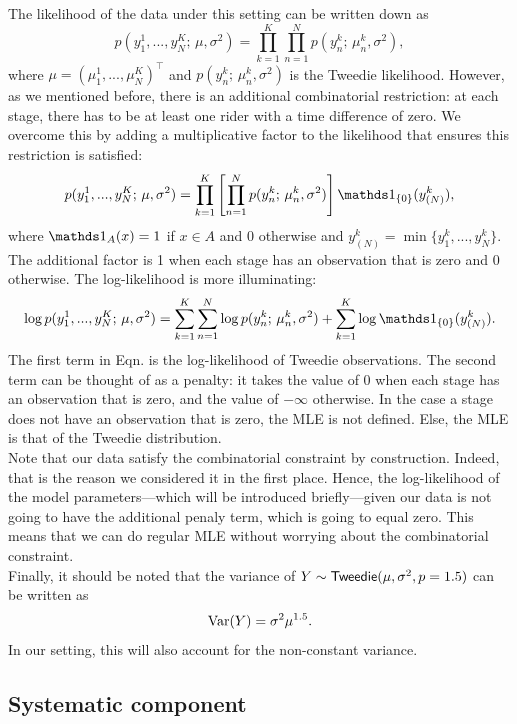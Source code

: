 \documentclass[aos,preprint]{imsart}
\begin{document}
The likelihood of the data under this setting can be written down as
\[
  p(y_1^1, ..., y_N^K; \, \mu, \sigma^2) = \prod_{k=1}^K \prod_{n=1}^N p(y_n^k; \, \mu_n^k, \sigma^2),
\]
where $\mu = (\mu_1^1, ..., \mu_N^K)^\top$ and $p(y_n^k; \, \mu_n^k, \sigma^2)$ is the Tweedie likelihood. However, as we mentioned before, there is an additional combinatorial restriction: at each stage, there has to be at least one rider with a time difference of zero. We overcome this by adding a multiplicative factor to the likelihood that ensures this restriction is satisfied:
\[
  p(y_1^1, ..., y_N^K; \, \mu, \sigma^2) = \prod_{k=1}^K \left[ \prod_{n=1}^N p(y_n^k; \, \mu_n^k, \sigma^2) \right] \ind_{\{ 0\}} (y_{(N)}^k),
\]
where $\ind_A(x) = 1$ if $x \in A$ and 0 otherwise and $y_{(N)}^k = \min \{y_1^k, ..., y_N^k \}$. The additional factor is 1 when each stage has an observation that is zero and 0 otherwise. The log-likelihood is more illuminating:
\[
  \log p(y_1^1, ..., y_N^K; \, \mu, \sigma^2) = \sum_{k=1}^K \sum_{n=1}^N \log p(y_n^k; \, \mu_n^k, \sigma^2) + \sum_{k=1}^K \log \ind_{\{ 0\}} (y_{(N)}^k). \label{eq:loglike}
\]
The first term in Eqn.  is the log-likelihood of \iid Tweedie observations. The second term can be thought of as a penalty: it takes the value of 0 when each stage has an observation that is zero, and the value of $-\infty$ otherwise. In the case a stage does not have an observation that is zero, the MLE is not defined. Else, the MLE is that of the Tweedie distribution. \\


Note that our data satisfy the combinatorial constraint by construction. Indeed, that is the reason we considered it in the first place. Hence, the log-likelihood of the model parameters---which will be introduced briefly---given our data is not going to have the additional penaly term, which is going to equal zero. This means that we can do regular MLE without worrying about the combinatorial constraint. \\


Finally, it should be noted that the variance of $Y \sim {\sf{Tweedie}}(\mu, \sigma^2, p = 1.5)$ can be written as
\[
  \operatorname{Var} (Y) = \sigma^2 \mu^{1.5}.
\]
In our setting, this will also account for the non-constant variance.


\subsection{Systematic component}
\end{document}
